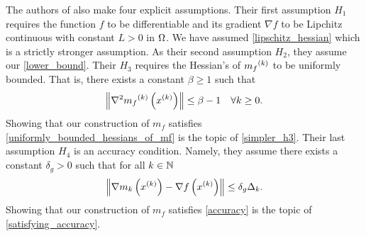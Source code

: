 The authors of \cite{Conejo:2013:GCT:2620806.2621814} also make four explicit assumptions.
Their first assumption $H_1$ requires the function $f$ to be differentiable and its gradient $\nabla f$ to be Lipchitz continuous with constant $L > 0$ in $\Omega$.
We have assumed \cref{lipschitz_hessian} which is a strictly stronger assumption.
As their second assumption $H_2$, they assume our \cref{lower_bound}.
Their $H_3$ requires the Hessian's of ${{m}_f}^{(k)}$ to be uniformly bounded.
That is, there exists a constant $\beta \ge 1$ such that
\begin{align}
\label{uniformly_bounded_hessians_of_mf}
\left\|\nabla^2 {{m}_f}^{(k)}\left(x^{(k)}\right)\right\| \le \beta - 1\quad \forall k \ge 0.
\end{align}
Showing that our construction of $m_f$ satisfies \cref{uniformly_bounded_hessians_of_mf} is the topic of \cref{simpler_h3}.
Their last assumption $H_4$ is an accuracy condition.
Namely, they assume there exists a constant $\delta_g>0$ such that for all $k \in \mathbb N$
\begin{align}
\label{accuracy}
\left\|\nabla m_k\left(x^{(k)}\right) - \nabla f\left(x^{(k)}\right)\right\| \le \delta_g \Delta_k.
\end{align}
Showing that our construction of $m_f$ satisfies \cref{accuracy} is the topic of \cref{satisfying_accuracy}.


%

%
% 
% 


